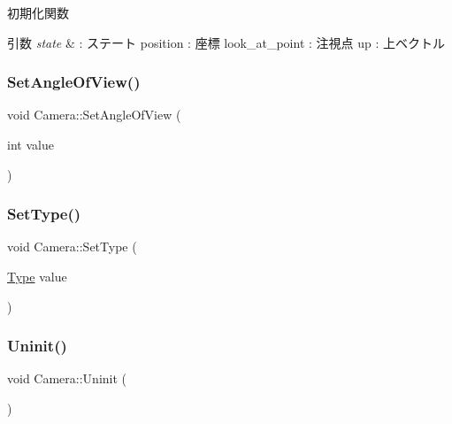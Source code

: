 初期化関数 


\begin{DoxyParams}{引数}
{\em state} & \+: ステート position \+: 座標 look\+\_\+at\+\_\+point \+: 注視点 up \+: 上ベクトル \\
\hline
\end{DoxyParams}
\mbox{\label{class_camera_a4c22c8ceed9126db627df9be7eb53a42}} 
\subsubsection{\texorpdfstring{Set\+Angle\+Of\+View()}{SetAngleOfView()}}
{\footnotesize\ttfamily void Camera\+::\+Set\+Angle\+Of\+View (\begin{DoxyParamCaption}\item[{int}]{value }\end{DoxyParamCaption})\hspace{0.3cm}{\ttfamily [inline]}}

\mbox{\label{class_camera_a6218126e761a8289c6e6bc8c66b05e47}} 
\subsubsection{\texorpdfstring{Set\+Type()}{SetType()}}
{\footnotesize\ttfamily void Camera\+::\+Set\+Type (\begin{DoxyParamCaption}\item[{\mbox{\hyperlink{class_camera_a3b0a1f58deca679ac665f61c480d1dcb}{Type}}}]{value }\end{DoxyParamCaption})\hspace{0.3cm}{\ttfamily [inline]}}

\mbox{\label{class_camera_a8b3337b3e560ea6a780d646bc8c509d7}} 
\subsubsection{\texorpdfstring{Uninit()}{Uninit()}}
{\footnotesize\ttfamily void Camera\+::\+Uninit (\begin{DoxyParamCaption}{ }\end{DoxyParamCaption})}



